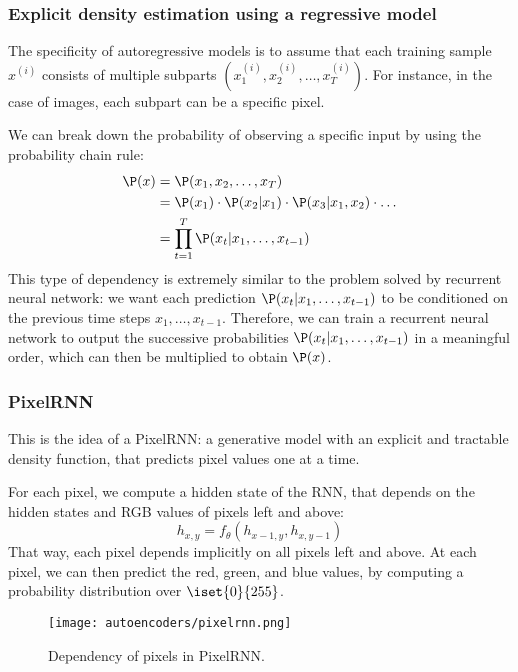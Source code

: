 \subsubsection{Explicit density estimation using a regressive model}
The specificity of autoregressive models is to assume that each training sample $x^{(i)}$ consists of multiple subparts $(x_1^{(i)}, x_2^{(i)}, \dots, x_T^{(i)})$. For instance, in the case of images, each subpart can be a specific pixel.

We can break down the probability of observing a specific input by using the probability chain rule:
\begin{equation*}
    \begin{aligned}
        \P(x) &= \P(x_1, x_2, \dots, x_T)\\
        &= \P(x_1) \cdot \P(x_2|x_1) \cdot \P(x_3|x_1, x_2)\cdot \dots\\
        &= \prod_{t=1}^T \P(x_t|x_1, \dots, x_{t-1})
    \end{aligned}
\end{equation*}
This type of dependency is extremely similar to the problem solved by recurrent neural network: we want each prediction $\P(x_t|x_1, \dots, x_{t-1})$ to be conditioned on the previous time steps $x_1, \dots, x_{t-1}$. Therefore, we can train a recurrent neural network to output the successive probabilities $\P(x_t|x_1, \dots, x_{t-1})$ in a meaningful order, which can then be multiplied to obtain $\P(x)$.

\subsubsection{PixelRNN}
This is the idea of a PixelRNN: a generative model with an explicit and tractable density function, that predicts pixel values one at a time.

For each pixel, we compute a hidden state of the RNN, that depends on the hidden states and RGB values of pixels left and above:
\begin{equation*}
    h_{x,y} = f_\theta(h_{x-1,y}, h_{x, y-1})
\end{equation*}
That way, each pixel depends implicitly on all pixels left and above.
At each pixel, we can then predict the red, green, and blue values, by computing a probability distribution over $\iset{0}{255}$.
\begin{figure}[H]
    \centering
    \texttt{[image: autoencoders/pixelrnn.png]}
    \caption{Dependency of pixels in PixelRNN.}
\end{figure}

